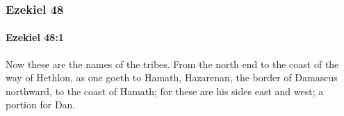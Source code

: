	\subsubsection{Ezekiel 48} %
		\label{EZEKIEL-48}

		\paragraph{Ezekiel 48:1} %
			\label{EZEKIEL-48-1}

			Now these are the names of the tribes. From the north end to the coast of the way of Hethlon, as one goeth to Hamath, Hazarenan, the border of Damascus northward, to the coast of Hamath; for these are his sides east and west; a portion for Dan.


